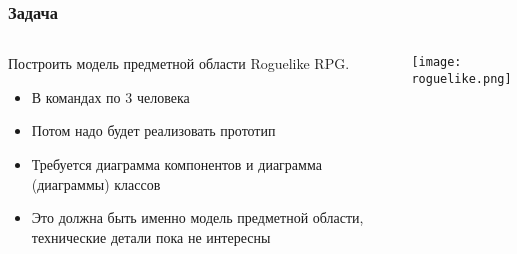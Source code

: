 \documentclass{../../slides-style}
\begin{document}
	\begin{frame}
		\frametitle{Задача}
		\begin{columns}
			\begin{column}{0.5\textwidth}
				Построить модель предметной области Roguelike RPG.

				\begin{itemize}
					\item В командах по 3 человека
					\item Потом надо будет реализовать прототип
					\item Требуется диаграмма компонентов и диаграмма (диаграммы) классов
					\item Это должна быть именно модель предметной области, технические детали пока не интересны
				\end{itemize}
			\end{column}
			\begin{column}{0.5\textwidth}
				\begin{center}
					\texttt{[image: roguelike.png]}
				\end{center}
			\end{column}
		\end{columns}
	\end{frame}
\end{document}
